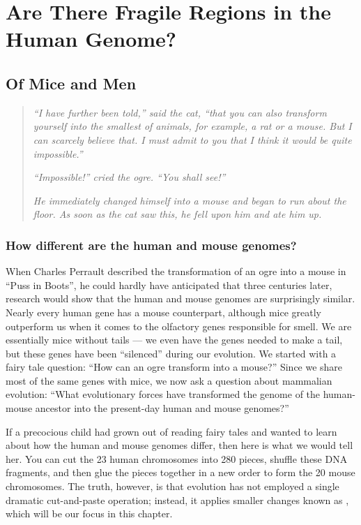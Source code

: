 \chapter{Are There Fragile Regions in the Human Genome?}

\section{Of Mice and Men}
\label{sec:of_mice_and_men}

\begin{quote}
\textit{``I have further been told,'' said the cat, ``that you can also transform yourself into the smallest of animals, for example, a rat or a mouse. But I can scarcely believe that. I must admit to you that I think it would be quite impossible.''}

\textit{``Impossible!'' cried the ogre. ``You shall see!''}

\textit{He immediately changed himself into a mouse and began to run about the floor. As soon as the cat saw this, he fell upon him and ate him up.}
\end{quote}

\subsection{How different are the human and mouse genomes?}
\label{subsec:how_different_are_the_human_and_mouse_genomes}

When Charles Perrault described the transformation of an ogre into a mouse in ``Puss in Boots'', he could hardly have anticipated that three centuries later, research would show that the human and mouse genomes are surprisingly similar.  Nearly every human gene has a mouse counterpart, although mice greatly outperform us when it comes to the olfactory genes responsible for smell. We are essentially mice without tails --- we even have the genes needed to make a tail, but these genes have been ``silenced'' during our evolution. We started with a fairy tale question: ``How can an ogre transform into a mouse?'' Since we share most of the same genes with mice, we now ask a question about mammalian evolution: ``What evolutionary forces have transformed the genome of the human-mouse ancestor into the present-day human and mouse genomes?''

If a precocious child had grown out of reading fairy tales and wanted to learn about how the human and mouse genomes differ, then here is what we would tell her. You can cut the 23 human chromosomes into 280 pieces, shuffle these DNA fragments, and then glue the pieces together in a new order to form the 20 mouse chromosomes. The truth, however, is that evolution has not employed a single dramatic cut-and-paste operation; instead, it applies smaller changes known as , which will be our focus in this chapter.

